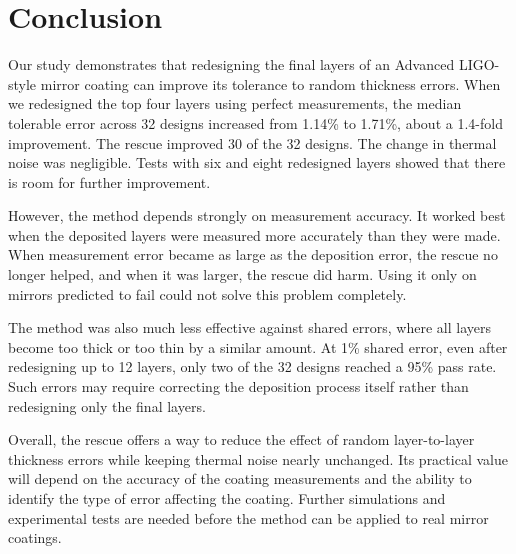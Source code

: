 \section{Conclusion}
\label{sec:conclusion}

Our study demonstrates that redesigning the final layers of an Advanced LIGO-style mirror coating can improve its tolerance to random thickness errors. When we redesigned the top four layers using perfect measurements, the median tolerable error across 32 designs increased from 1.14\% to 1.71\%, about a 1.4-fold improvement. The rescue improved 30 of the 32 designs. The change in thermal noise was negligible. Tests with six and eight redesigned layers showed that there is room for further improvement.

However, the method depends strongly on measurement accuracy. It worked best when the deposited layers were measured more accurately than they were made. When measurement error became as large as the deposition error, the rescue no longer helped, and when it was larger, the rescue did harm. Using it only on mirrors predicted to fail could not solve this problem completely.

The method was also much less effective against shared errors, where all layers become too thick or too thin by a similar amount. At 1\% shared error, even after redesigning up to 12 layers, only two of the 32 designs reached a 95\% pass rate. Such errors may require correcting the deposition process itself rather than redesigning only the final layers.

Overall, the rescue offers a way to reduce the effect of random layer-to-layer thickness errors while keeping thermal noise nearly unchanged. Its practical value will depend on the accuracy of the coating measurements and the ability to identify the type of error affecting the coating. Further simulations and experimental tests are needed before the method can be applied to real mirror coatings.
